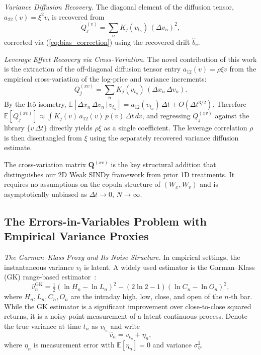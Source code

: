 \documentclass[reprint, amsmath, amssymb, aps, prl, superscriptaddress, nofootinbib]{revtex4-2}
\begin{document}
\textit{Variance Diffusion Recovery.}
The diagonal element of the diffusion tensor, $a_{22}(v) = \xi^2 v$, is recovered from
\begin{equation}
  Q_j^{(v)} = \sum_{n} K_j(v_{t_n})\,(\Delta v_n)^2,
  \label{eq:Qv_j}
\end{equation}
corrected via (\ref{eq:bias_correction}) using the recovered drift $\hat{b}_v$.

\textit{Leverage Effect Recovery via Cross-Variation.}
The novel contribution of this work is the extraction of the off-diagonal diffusion
tensor entry $a_{12}(v) = \rho\xi v$ from the empirical cross-variation of the
log-price and variance increments:
\begin{equation}
  Q_j^{(xv)} = \sum_{n} K_j(v_{t_n})\,(\Delta x_n\,\Delta v_n).
  \label{eq:Qxv_j}
\end{equation}
By the It\^{o} isometry, $\mathbb{E}[\Delta x_n\,\Delta v_n \,|\, v_{t_n}]
= a_{12}(v_{t_n})\,\Delta t + O(\Delta t^{3/2})$. Therefore
$\mathbb{E}[Q_j^{(xv)}] \approx \int K_j(v)\,a_{12}(v)\,p(v)\,\Delta t\,dv$,
and regressing $Q_j^{(xv)}$ against the library $\{v\,\Delta t\}$ directly yields
$\rho\xi$ as a single coefficient. The leverage correlation $\rho$ is then
disentangled from $\xi$ using the separately recovered variance diffusion
estimate.

The cross-variation matrix $\mathbf{Q}^{(xv)}$ is the key structural addition
that distinguishes our 2D Weak SINDy framework from prior 1D treatments. It
requires no assumptions on the copula structure of $(W_x, W_v)$ and is
asymptotically unbiased as $\Delta t \to 0$, $N\to\infty$.

\subsection{The Errors-in-Variables Problem with Empirical Variance Proxies}

\textit{The Garman--Klass Proxy and Its Noise Structure.}
In empirical settings, the instantaneous variance $v_t$ is latent. A widely used
estimator is the Garman--Klass (GK) range-based estimator~\cite{GarmanKlass1980}:
\begin{equation}
  \widehat{v}_n^{\mathrm{GK}} =
    \tfrac{1}{2}(\ln H_n - \ln L_n)^2
    - (2\ln 2 - 1)(\ln C_n - \ln O_n)^2,
\end{equation}
where $H_n, L_n, C_n, O_n$ are the intraday high, low, close, and open of the
$n$-th bar. While the GK estimator is a significant improvement over close-to-close
squared returns, it is a noisy point measurement of a latent continuous process.
Denote the true variance at time $t_n$ as $v_{t_n}$ and write
\begin{equation}
  \widehat{v}_n = v_{t_n} + \eta_n,
\end{equation}
where $\eta_n$ is measurement error with $\mathbb{E}[\eta_n] = 0$ and variance
$\sigma_\eta^2$.
\end{document}
